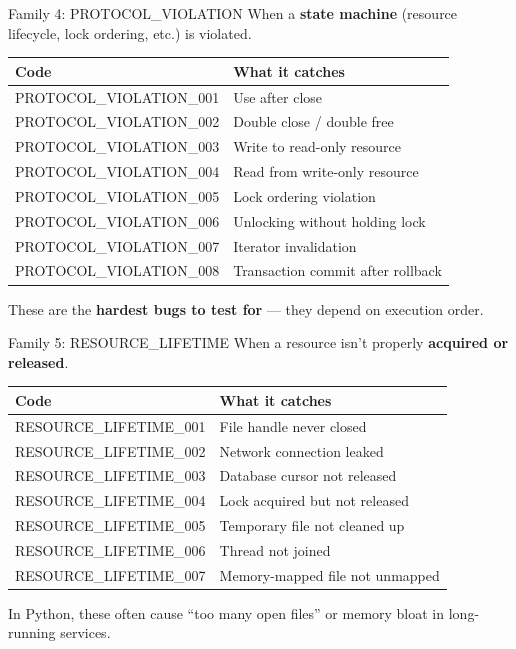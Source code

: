 \documentclass[aspectratio=169,10pt]{beamer}
\begin{document}
\begin{frame}{Family 4: PROTOCOL\_VIOLATION}
When a \textbf{state machine} (resource lifecycle, lock ordering, etc.) is violated.
\vspace{0.3em}
{\scriptsize
\begin{tabular}{@{}ll@{}}
\textbf{Code} & \textbf{What it catches} \\
\hline
PROTOCOL\_VIOLATION\_001 & Use after close \\
PROTOCOL\_VIOLATION\_002 & Double close / double free \\
PROTOCOL\_VIOLATION\_003 & Write to read-only resource \\
PROTOCOL\_VIOLATION\_004 & Read from write-only resource \\
PROTOCOL\_VIOLATION\_005 & Lock ordering violation \\
PROTOCOL\_VIOLATION\_006 & Unlocking without holding lock \\
PROTOCOL\_VIOLATION\_007 & Iterator invalidation \\
PROTOCOL\_VIOLATION\_008 & Transaction commit after rollback \\
\end{tabular}}
\vspace{0.3em}
These are the \textbf{hardest bugs to test for} --- they depend on execution order.
\end{frame}

\begin{frame}{Family 5: RESOURCE\_LIFETIME}
When a resource isn't properly \textbf{acquired or released}.
\vspace{0.3em}
{\scriptsize
\begin{tabular}{@{}ll@{}}
\textbf{Code} & \textbf{What it catches} \\
\hline
RESOURCE\_LIFETIME\_001 & File handle never closed \\
RESOURCE\_LIFETIME\_002 & Network connection leaked \\
RESOURCE\_LIFETIME\_003 & Database cursor not released \\
RESOURCE\_LIFETIME\_004 & Lock acquired but not released \\
RESOURCE\_LIFETIME\_005 & Temporary file not cleaned up \\
RESOURCE\_LIFETIME\_006 & Thread not joined \\
RESOURCE\_LIFETIME\_007 & Memory-mapped file not unmapped \\
\end{tabular}}
\vspace{0.3em}
In Python, these often cause ``too many open files'' or memory bloat in long-running services.
\end{frame}
\end{document}
